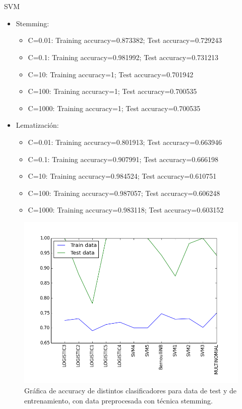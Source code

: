 \documentclass[letter, 10pt]{article}
\begin{document}
\\\\
SVM
\begin{itemize}
  \item Stemming: 
  \begin{itemize}
    \item C=0.01: Training accuracy=0.873382; Test accuracy=0.729243
    \item C=0.1: Training accuracy=0.981992; Test accuracy=0.731213
    \item C=10: Training accuracy=1; Test accuracy=0.701942
    \item C=100: Training accuracy=1; Test accuracy=0.700535
    \item C=1000: Training accuracy=1; Test accuracy=0.700535
  \end{itemize}
  \item Lematización: 
    \begin{itemize}
    \item C=0.01: Training accuracy=0.801913; Test accuracy=0.663946
    \item C=0.1: Training accuracy=0.907991; Test accuracy=0.666198
    \item C=10: Training accuracy=0.984524; Test accuracy=0.610751
    \item C=100: Training accuracy=0.987057; Test accuracy=0.606248
    \item C=1000: Training accuracy=0.983118; Test accuracy=0.603152
  \end{itemize}
\end{itemize}

\begin{figure}[h]
\begin{center}
\includegraphics[width=1\textwidth]{Images/figure_pregunta_2.png}
\caption{Gráfica de accuracy de distintos clasificadores para data de test y de entrenamiento, con data preprocesada con técnica stemming.}
\label{G1.1}
\end{center}
\end{figure}
\end{document}
